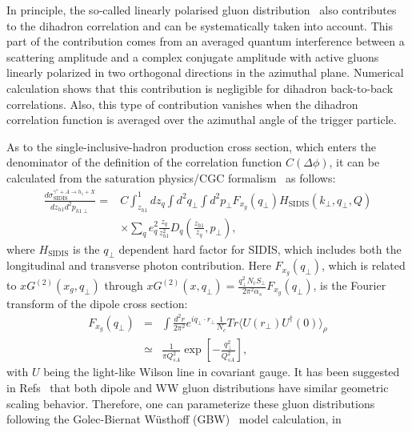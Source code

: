 In principle, the so-called linearly polarised gluon
distribution~\cite{Metz:2011wb,Dominguez:2011br} also contributes to the dihadron
correlation and can be systematically taken into account. This part of the
contribution comes from an averaged quantum interference between a scattering
amplitude and a complex conjugate amplitude with active gluons linearly
polarized in two orthogonal directions in the azimuthal plane. Numerical
calculation shows that this contribution is negligible for dihadron back-to-back
correlations. Also, this type of contribution vanishes when the dihadron correlation function 
is averaged over the azimuthal angle of the trigger particle. 


As to the single-inclusive-hadron production cross section, which enters the
denominator of the definition of the correlation function $C(\Delta\phi)$, it
can be calculated from the saturation physics/CGC formalism~\cite{Marquet:2009ca} as
follows:
\begin{eqnarray}\label{eqn:xstrigCGC}
\frac{d\sigma^{\gamma^{*}+A\rightarrow h_{1}+X}_{\textrm{SIDIS}}}{dz_{h1}d^{2}p_{h1\perp}} 
= & C \int^{1}_{z_{h1}}dz_{q} \int
d^{2}q_{\perp} \int d^{2}p_{\perp} F_{x_{g}}(q_{\perp})H_{\textrm{SIDIS}}(k_{\perp},q_{\perp},Q) \nonumber \\ 
  & \times \sum_{q} e^{2}_{q}\frac{z_{q}}{z^{2}_{h1}}D_{q}(\frac{z_{h1}}{z_{q}},p_{\perp}),
\end{eqnarray}
where $H_{\textrm{SIDIS}}$ is the $q_{\perp}$ dependent hard factor for SIDIS,
which includes both the longitudinal and transverse photon contribution. Here
$F_{x_{g}}(q_\perp)$, which is related to $xG^{(2)}(x_g,q_\perp)$ through $xG^{(2)}(x,q_{\perp})=\frac{q^{2}_{\perp}N_{c}S_{\perp}}{2\pi^{2}\alpha_{s}}F_{x_{g}}(q_{\perp})$, is the Fourier
transform of the dipole cross section:
\begin{eqnarray}
F_{x_{g}}(q_{\perp})& = &\int \frac{d^{2}r}{2\pi^{2}}e^{iq_{\perp}\cdot
r_{\perp}} \frac{1}{N_{c}} Tr\langle
U(r_{\perp})U^{\dag}(0)\rangle_{\rho} \nonumber \\ 
& \simeq &\frac{1}{\pi
Q^{2}_{sA}}\exp[-\frac{q_{\perp}^{2}}{Q^{2}_{sA}}], 
\end{eqnarray}
with $U$ being the light-like Wilson line in covariant gauge. 
It has been suggested in Refs~\cite{Dominguez:2011gc, Dumitru:2011vk} that both
dipole and WW gluon distributions have similar geometric scaling behavior.
Therefore, one can parameterize these gluon distributions following the
Golec-Biernat W\"{u}sthoff (GBW)~\cite{GolecBiernat:1998js} model calculation, in
